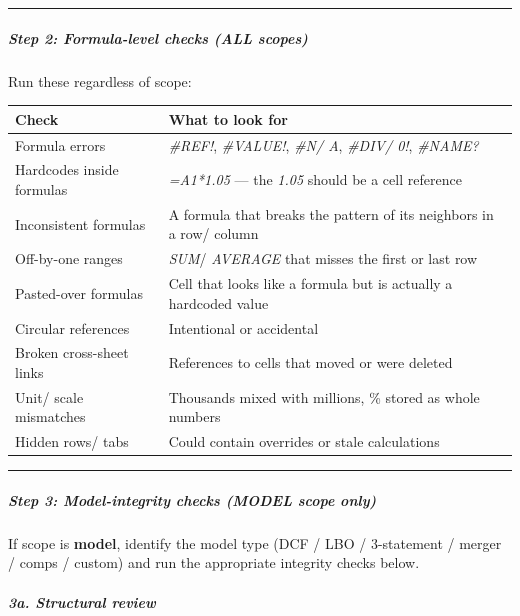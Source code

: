 \documentclass[11pt]{article}
\begin{document}
\vspace{0.5em}\hrule\vspace{0.5em}

\subparagraph{Step 2: Formula-level checks (ALL scopes)}\mbox{}\par

Run these regardless of scope:


\begingroup
\small
\setlength{\tabcolsep}{2pt}
\begin{longtable}{>{\RaggedRight\arraybackslash\hspace{0pt}}p{}>{\RaggedRight\arraybackslash\hspace{0pt}}p{}}
\toprule
{} \textbf{Check} & \textbf{What to look for} \\
\midrule
{} Formula errors & \emph{\#REF!}, \emph{\#VALUE!}, \emph{\#N/ A}, \emph{\#DIV/ 0!}, \emph{\#NAME?} \\
{} Hardcodes inside formulas & \emph{=A1*1.05} — the \emph{1.05} should be a cell reference \\
{} Inconsistent formulas & A formula that breaks the pattern of its neighbors in a row/ column \\
{} Off-by-one ranges & \emph{SUM}/ \emph{AVERAGE} that misses the first or last row \\
{} Pasted-over formulas & Cell that looks like a formula but is actually a hardcoded value \\
{} Circular references & Intentional or accidental \\
{} Broken cross-sheet links & References to cells that moved or were deleted \\
{} Unit/ scale mismatches & Thousands mixed with millions, \% stored as whole numbers \\
{} Hidden rows/ tabs & Could contain overrides or stale calculations \\
\bottomrule
\end{longtable}
\endgroup

\vspace{0.5em}\hrule\vspace{0.5em}

\subparagraph{Step 3: Model-integrity checks (MODEL scope only)}\mbox{}\par

If scope is \textbf{model}, identify the model type (DCF / LBO / 3-statement / merger / comps / custom) and run the appropriate integrity checks below.


\subparagraph{3a. Structural review}\mbox{}\par
\end{document}
